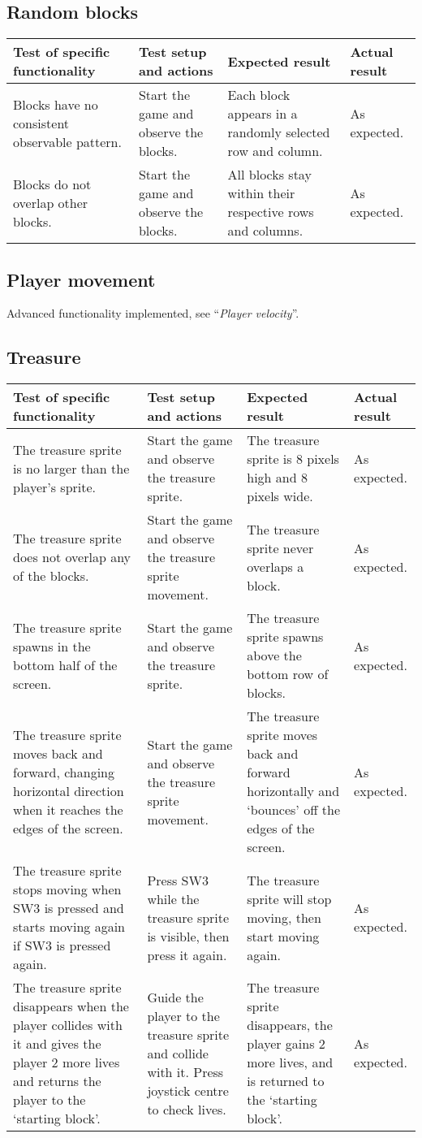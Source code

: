 \documentclass[10pt, titlepage]{article}
\newenvironment{testplan}[1]
{
\newcommand{\test}[4]{\midrule ##1 & ##2 & ##3 & ##4 \\}
\subsection{#1}
\begin{longtable}{L{0.3\textwidth}L{0.2\textwidth}L{0.25\textwidth}L{0.15\textwidth}}
\toprule
\textbf{Test of specific functionality} & \textbf{Test setup and actions} & \textbf{Expected result} & \textbf{Actual result} \\
}
{
\bottomrule
\end{longtable}
}
\begin{document}
\begin{testplan}{Random blocks}
\test{Blocks have no consistent observable pattern.}{Start the game and observe the blocks.}{Each block appears in a randomly selected row and column.}{As expected.}
\test{Blocks do not overlap other blocks.}{Start the game and observe the blocks.}{All blocks stay within their respective rows and columns.}{As expected.}
\end{testplan}

\subsection{Player movement}
Advanced functionality implemented, see ``\textit{Player velocity}''.

\begin{testplan}{Treasure}
\test{The treasure sprite is no larger than the player's sprite.}{Start the game and observe the treasure sprite.}{The treasure sprite is 8 pixels high and 8 pixels wide.}{As expected.}
\test{The treasure sprite does not overlap any of the blocks.}{Start the game and observe the treasure sprite movement.}{The treasure sprite never overlaps a block.}{As expected.}
\test{The treasure sprite spawns in the bottom half of the screen.}{Start the game and observe the treasure sprite.}{The treasure sprite spawns above the bottom row of blocks.}{As expected.}
\test{The treasure sprite moves back and forward, changing horizontal direction when it reaches the edges of the screen.}{Start the game and observe the treasure sprite movement.}{The treasure sprite moves back and forward horizontally and `bounces' off the edges of the screen.}{As expected.}
\test{The treasure sprite stops moving when SW3 is pressed and starts moving again if SW3 is pressed again.}{Press SW3 while the treasure sprite is visible, then press it again.}{The treasure sprite will stop moving, then start moving again.}{As expected.}
\test{The treasure sprite disappears when the player collides with it and gives the player 2 more lives and returns the player to the `starting block'.}{Guide the player to the treasure sprite and collide with it. Press joystick centre to check lives.}{The treasure sprite disappears, the player gains 2 more lives, and is returned to the `starting block'.}{As expected.}
\end{testplan}
\end{document}
